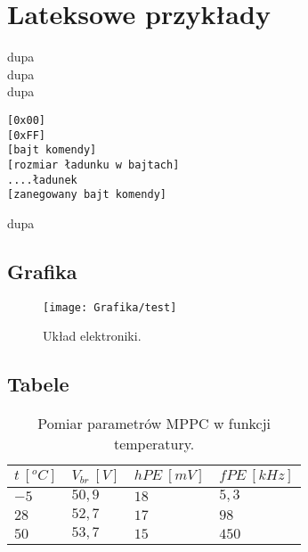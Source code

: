 \section{Lateksowe przykłady}

\TODO
\CONF

\pagecolor{orange}

\vspace{1cm}
dupa\\
dupa\\
dupa\\
\begin{cminipage}
	\texttt{[0x00]\\}
	\texttt{[0xFF]\\}
	\texttt{[bajt komendy]\\}
	\texttt{[rozmiar ładunku w bajtach]\\}
	\texttt{....ładunek\\}
	\texttt{[zanegowany bajt komendy]\\}
\end{cminipage}
dupa\\

\subsection{Grafika}

\begin{figure}[h]
	\centering
	\texttt{[image: Grafika/test]}
	\caption{Układ elektroniki.}
	\label{fig:uklad}
\end{figure}

\subsection{Tabele}

\begin{table}[!h]
	\centering
	\begin{tabular}{|l|l|l|l|}
		\hline
		\boldmath$t\ [^oC]$ & \boldmath$V_{br}\ [V]$ & \boldmath$hPE\ [mV]$ & \boldmath$fPE\ [kHz]$\\ 
		\hline
		\hline
		$-5$ & $50,9$ & $18$ & $5,3$\\
		\hline
		$28$ & $52,7$ & $17$ & $98$ \\
		\hline
		$50$ & $53,7$ & $15$ & $450$ \\
		\hline
	\end{tabular}
	\caption{Pomiar parametrów MPPC w funkcji temperatury.}
	\label{tab:temp}
\end{table}

